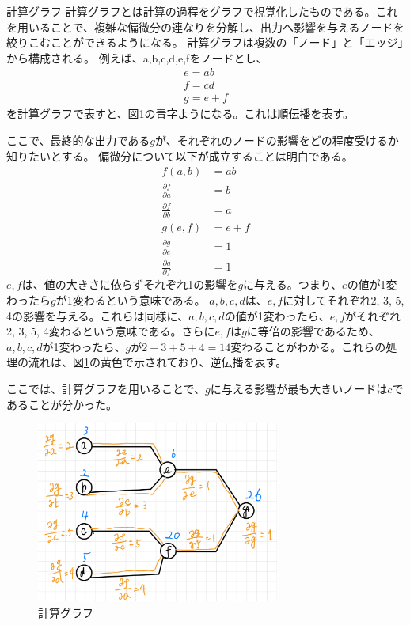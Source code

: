 \documentclass{ltjsarticle}
\begin{document}
\begin{itembox}[l]{計算グラフ}
  計算グラフとは計算の過程をグラフで視覚化したものである。これを用いることで、複雑な偏微分の連なりを分解し、出力へ影響を与えるノードを絞りこむことができるようになる。
  計算グラフは複数の「ノード」と「エッジ」から構成される。
  例えば、a,b,c,d,e,fをノードとし、
  \begin{align}
    e = ab\\
    f = cd\\
    g = e + f
  \end{align}
  を計算グラフで表すと、図\ref{fig:calc_graph}の青字ようになる。これは順伝播を表す。
  \par
  ここで、最終的な出力である$g$が、それぞれのノードの影響をどの程度受けるか知りたいとする。
  偏微分について以下が成立することは明白である。
  \begin{align}
    f(a,b) &= ab\\
    \frac{\partial f}{\partial a} &= b\\
    \frac{\partial f}{\partial b} &= a\\
    g(e,f) &= e + f\\
    \frac{\partial g}{\partial e} &= 1\\
    \frac{\partial g}{\partial f} &= 1
  \end{align}
  $e, f$は、値の大きさに依らずそれぞれ1の影響を$g$に与える。つまり、$e$の値が1変わったら$g$が1変わるという意味である。
  $a, b, c, d$は、$e, f$に対してそれぞれ2, 3, 5, 4の影響を与える。これらは同様に、$a, b, c, d$の値が1変わったら、$e, f$がそれぞれ2, 3, 5, 4変わるという意味である。さらに$e, f$は$g$に等倍の影響であるため、$a, b, c, d$が1変わったら、$g$が$2+3+5+4=14$変わることがわかる。これらの処理の流れは、図\ref{fig:calc_graph}の黄色で示されており、逆伝播を表す。
  \par
  ここでは、計算グラフを用いることで、$g$に与える影響が最も大きいノードは$c$であることが分かった。

\end{itembox}

\begin{figure}[htbp]
  \centering
  \includegraphics[width=8cm]{./capture/calc_graph.png}
  \caption{計算グラフ}
  \label{fig:calc_graph}
\end{figure}
\end{document}
